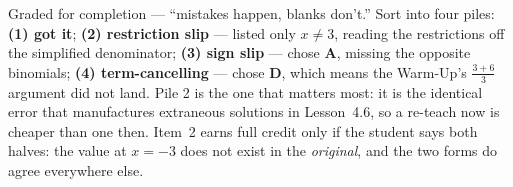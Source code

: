 \documentclass[10pt]{article}
\begin{document}
\begin{teachernote}
Graded for completion --- ``mistakes happen, blanks don't.'' Sort into four piles: \textbf{(1) got it};
\textbf{(2) restriction slip} --- listed only $x\neq3$, reading the restrictions off the simplified
denominator; \textbf{(3) sign slip} --- chose \textbf{A}, missing the opposite binomials; \textbf{(4)
term-cancelling} --- chose \textbf{D}, which means the Warm-Up's $\frac{3+6}{3}$ argument did not land.
Pile 2 is the one that matters most: it is the identical error that manufactures extraneous solutions
in Lesson~4.6, so a re-teach now is cheaper than one then. Item~2 earns full credit only if the student
says both halves: the value at $x=-3$ does not exist in the \emph{original}, and the two forms do agree
everywhere else.
\end{teachernote}
\end{document}
